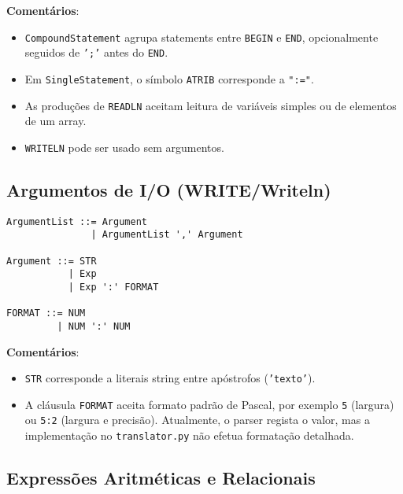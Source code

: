 \noindent

\textbf{Comentários}:
\begin{itemize}
    \item \texttt{CompoundStatement} agrupa statements entre \texttt{BEGIN} e \texttt{END}, opcionalmente seguidos de \texttt{';'} antes do \texttt{END}.
    \item Em \texttt{SingleStatement}, o símbolo \texttt{ATRIB} corresponde a \texttt{":="}.
    \item As produções de \texttt{READLN} aceitam leitura de variáveis simples ou de elementos de um array.
    \item \texttt{WRITELN} pode ser usado sem argumentos.
\end{itemize}

\subsection{Argumentos de I/O (WRITE/Writeln)}

\begin{verbatim}
ArgumentList ::= Argument
               | ArgumentList ',' Argument

Argument ::= STR
           | Exp
           | Exp ':' FORMAT

FORMAT ::= NUM
         | NUM ':' NUM
\end{verbatim}

\noindent

\textbf{Comentários}:
\begin{itemize}
    \item \texttt{STR} corresponde a literais string entre apóstrofos (\texttt{'texto'}).
    \item A cláusula \texttt{FORMAT} aceita formato padrão de Pascal, por exemplo \texttt{5} (largura) ou \texttt{5:2} (largura e precisão). Atualmente, o parser regista o valor, mas a implementação no \texttt{translator.py} não efetua formatação detalhada.
\end{itemize}

\subsection{Expressões Aritméticas e Relacionais}

